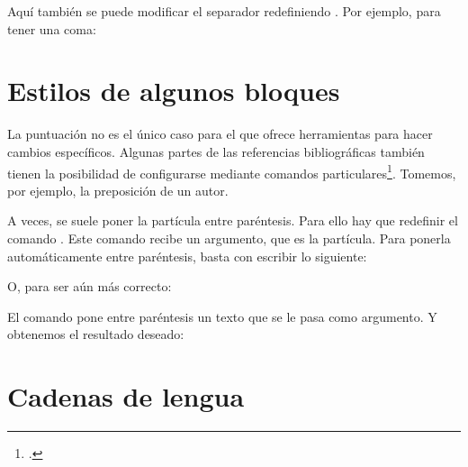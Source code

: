 Aquí también se puede modificar el separador redefiniendo . Por ejemplo, para tener una coma:

\begin{latexcode}
\renewcommand{\multicitedelim}[0]{\addcomma\addspace}
\end{latexcode}


\section{Estilos de algunos bloques}

La puntuación no es el único caso para el que  ofrece herramientas para hacer cambios específicos. Algunas partes de las referencias bibliográficas también tienen la posibilidad de configurarse mediante comandos particulares\footcite{biblatex_hooks}. Tomemos, por ejemplo, la preposición de un autor.
    \bibverbose
    \begin{quotation}
    \cite{BeauvoirSexe}
    \end{quotation}
    
    \renewcommand{\mkbibnameprefix}[1]{\parentext{#1}}


A veces, se suele poner la partícula entre paréntesis. Para ello hay que redefinir el comando . Este comando recibe un argumento, que es la partícula. Para ponerla automáticamente entre paréntesis, basta con escribir lo siguiente:
    
    \begin{latexcode}
\renewcommand{\mkbibnameprefix}[1]{(#1)}
    \end{latexcode}

    
O, para ser aún más correcto:
    
    \begin{latexcode}
\renewcommand{\mkbibnameprefix}[1]{\parentext{#1}}
    \end{latexcode}


El comando  pone entre paréntesis un texto que se le pasa como argumento. Y obtenemos el resultado deseado: 

    \begin{quotation}
    \cite{BeauvoirSexe}
    \end{quotation}
    
\bibverbose

\section{Cadenas de lengua}\label{i18nchaines}
    
